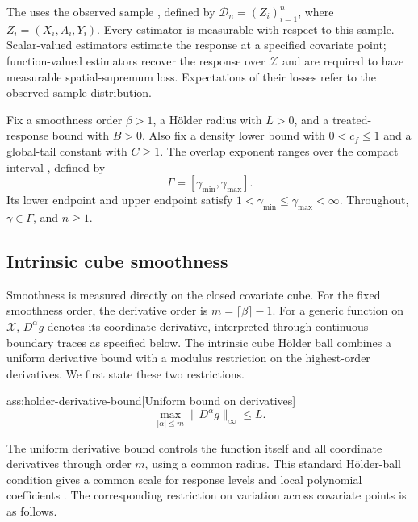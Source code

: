 \documentclass[11pt]{article}
\begin{document}
The  uses the observed sample , defined by \(\mathcal D_n=(Z_i)_{i=1}^n\), where \(Z_i=(X_i,A_i,Y_i)\). Every estimator is measurable with respect to this sample. Scalar-valued estimators estimate the response at a specified covariate point; function-valued estimators recover the response over \(\mathcal X\) and are required to have measurable spatial-supremum loss. Expectations of their losses refer to the observed-sample distribution.

Fix a smoothness order \(\beta>1\), a Hölder radius  with \(L>0\), and a treated-response bound  with \(B>0\). Also fix a density lower bound  with \(0<c_f\le1\) and a global-tail constant  with \(C\ge1\). The overlap exponent ranges over the compact interval , defined by
\[
\Gamma=[\gamma_{\min},\gamma_{\max}].
\]
Its lower endpoint  and upper endpoint  satisfy \(1<\gamma_{\min}\le\gamma_{\max}<\infty\). Throughout, \(\gamma\in\Gamma\), and \(n\ge1\).

\subsection{Intrinsic cube smoothness}

Smoothness is measured directly on the closed covariate cube. For the fixed smoothness order, the derivative order  is \(m=\lceil\beta\rceil-1\). For a generic function  on \(\mathcal X\), \(D^\alpha g\) denotes its coordinate derivative, interpreted through continuous boundary traces as specified below. The intrinsic cube Hölder ball  combines a uniform derivative bound with a modulus restriction on the highest-order derivatives. We first state these two restrictions.

\begin{assumptionv}{ass:holder-derivative-bound}[Uniform bound on derivatives]
\[
\max_{|\alpha|\le m}\|D^\alpha g\|_\infty\le L.
\]
\end{assumptionv}

The uniform derivative bound controls the function itself and all coordinate derivatives through order \(m\), using a common radius. This standard Hölder-ball condition gives a common scale for response levels and local polynomial coefficients \citep{Dorn2026GlobalOverlap}. The corresponding restriction on variation across covariate points is as follows.
\end{document}
